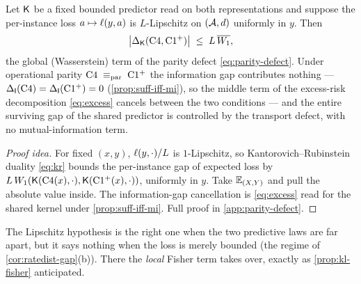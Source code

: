 \begin{theorem}
\label{thm:defect-risk-gap}
Let $\mathsf{K}$ be a fixed bounded predictor read on both representations and
suppose the per-instance loss $a\mapsto\ell(y,a)$ is $L$-Lipschitz on
$(\mathcal{A},d)$ uniformly in $y$. Then
\begin{equation}
  \label{eq:defect-risk-gap}
  \big|\Delta_{\mathsf{K}}(\mathrm{C}4,\mathrm{C1^{+}})\big|
  \;\le\;
  L\,\overline{W_{1}},
\end{equation}
the global (Wasserstein) term of the parity defect \eqref{eq:parity-defect}.
Under operational parity $\mathrm{C}4\;\equiv_{\mathrm{par}}\;\mathrm{C1^{+}}$ the information gap
contributes nothing --- $\Delta_{\mathsf{I}}\!\left(\mathrm{C}4\right)=\Delta_{\mathsf{I}}\!\left(\mathrm{C1^{+}}\right)=0$
(\cref{prop:suff-iff-mi}), so the middle term of the excess-risk decomposition
\eqref{eq:excess} cancels between the two conditions --- and the entire surviving
gap of the shared predictor is controlled by the transport defect, with no
mutual-information term.
\end{theorem}

\begin{proof}[Proof idea]
For fixed $(x,y)$, $\ell(y,\cdot)/L$ is $1$-Lipschitz, so
Kantorovich--Rubinstein duality \eqref{eq:kr} bounds the per-instance gap of
expected loss by $L\,W_{1}(\mathsf{K}(\mathrm{C}4(x),\cdot),
\mathsf{K}(\mathrm{C1^{+}}(x),\cdot))$, uniformly in $y$. Take $\mathbb{E}_{(X,Y)}$ and
pull the absolute value inside. The information-gap cancellation is
\eqref{eq:excess} read for the shared kernel under \cref{prop:suff-iff-mi}. Full
proof in \cref{app:parity-defect}.
\end{proof}

The Lipschitz hypothesis is the right one when the two predictive laws are far
apart, but it says nothing when the loss is merely bounded (the regime of
\cref{cor:ratedist-gap}(b)). There the \emph{local} Fisher term takes over,
exactly as \cref{prop:kl-fisher} anticipated.

